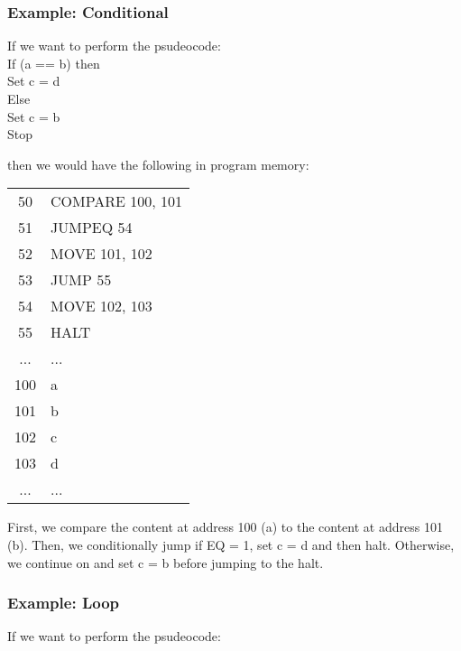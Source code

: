 \documentclass[]{article}
\begin{document}
\subsubsection{Example: Conditional}
\bigbreak

If we want to perform the psudeocode:\\

\setlength{\parindent}{0.5cm}\noindent
If (a == b) then\\
\indent Set c = d\\
Else\\
\indent Set c = b\\
Stop\\
\setlength{\parindent}{0pt}

then we would have the following in program memory: \\

\begin{center}
	\begin{tabular}{c|l|}\cline{2-2}
		50 & COMPARE 100, 101 \\\cline{2-2}
		51 & JUMPEQ 54 \\\cline{2-2}
		52 & MOVE 101, 102 \\\cline{2-2}
		53 & JUMP 55 \\\cline{2-2}
		54 & MOVE 102, 103 \\\cline{2-2}
		55 & HALT \\\cline{2-2}
		... & ... \\\cline{2-2}
		100 & a \\\cline{2-2}
		101 & b \\\cline{2-2}
		102 & c \\\cline{2-2}
		103 & d \\\cline{2-2}
		... & ... \\\cline{2-2}
	\end{tabular}
	\bigbreak
\end{center}

First, we compare the content at address 100 (a) to the content at address 101 (b). Then, we conditionally jump if EQ = 1, set c = d and then halt. Otherwise, we continue on and set c = b before jumping to the halt.\\

\subsubsection{Example: Loop}
\bigbreak

If we want to perform the psudeocode:\\
\end{document}
